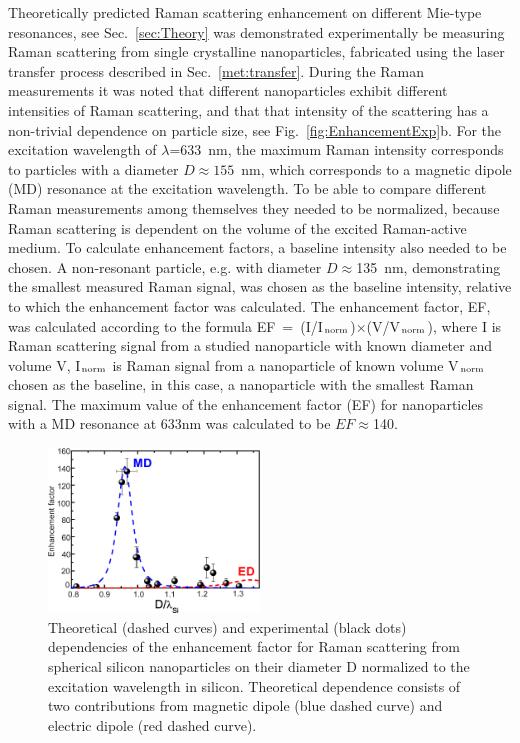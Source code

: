             Theoretically predicted Raman scattering enhancement on different Mie-type resonances, see Sec.~\ref{sec:Theory} was demonstrated
        experimentally be measuring Raman scattering from single crystalline nanoparticles, fabricated using the laser transfer process described
        in Sec.~\ref{met:transfer}. During the Raman measurements it was noted that different nanoparticles exhibit different intensities of
        Raman scattering, and that that intensity of the scattering has a non-trivial dependence on particle size, see Fig.~\ref{fig:EnhancementExp}b.
        For the excitation wavelength of $\lambda$=633~nm, the maximum Raman intensity corresponds to particles with a diameter $D\approx 155$~nm,
        which corresponds to a magnetic dipole (MD) resonance at the excitation wavelength. To be able to compare different Raman measurements among
        themselves they needed to be normalized, because Raman scattering is dependent on the volume of the excited Raman-active medium. To calculate
        enhancement factors, a baseline intensity also needed to be chosen. A non-resonant particle, e.g. with diameter $D\approx$135~nm, demonstrating
        the smallest measured Raman signal,
        was chosen as the baseline intensity, relative to which the enhancement factor was calculated. The enhancement factor, EF, was
        calculated according to the formula EF~=~(I/I$_{\rm norm}$)$\times$(V/V$_{\rm norm}$), where I is Raman
        scattering signal from a studied nanoparticle with known diameter and volume V, I$_{\rm norm}$ is Raman signal from
        a nanoparticle of known volume V$_{\rm norm}$ chosen as the baseline, in this case, a nanoparticle with the smallest Raman signal.
        The maximum value of the enhancement factor (EF) for nanoparticles with a MD resonance at 633nm was calculated to be $EF\approx$140.

        \begin{figure}[!hb]
            \begin{center}
                \includegraphics[width=0.5\textwidth]{figs/results/enhance/EnhancementExperimentTheory.eps}
            \end{center}
            \caption{Theoretical (dashed curves) and experimental (black dots) dependencies of the enhancement factor for Raman
            scattering from spherical silicon nanoparticles on their diameter D normalized to the excitation wavelength in silicon.
            Theoretical dependence consists of two contributions from magnetic dipole (blue dashed curve) and electric dipole
            (red dashed curve).}
            \label{fig:EnhancementExpTheory}
        \end{figure}

